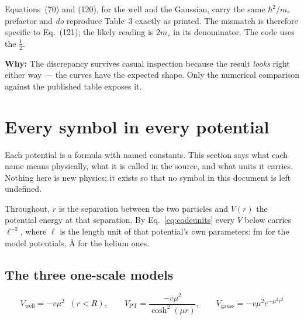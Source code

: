 \documentclass[11pt,a4paper]{article}
\newcommand{\why}[1]{\medskip\noindent\textbf{Why:} #1\medskip}
\begin{document}
Equations~(70) and (120), for the well and the Gaussian, carry the same
$\hbar^2/m_r$ prefactor and \emph{do} reproduce Table~3 exactly as printed. The
mismatch is therefore specific to Eq.~(121); the likely reading is $2m_r$ in its
denominator. The code uses the $\tfrac12$.

\why{The discrepancy survives casual inspection because the result
\emph{looks} right either way --- the curves have the expected shape. Only the
numerical comparison against the published table exposes it.}

\section{Every symbol in every potential}
\label{sec:symbols}

Each potential is a formula with named constants. This section says what each
name means physically, what it is called in the source, and what units it
carries. Nothing here is new physics; it exists so that no symbol in this
document is left undefined.

Throughout, $r$ is the separation between the two particles and $V(r)$ the
potential energy at that separation. By Eq.~\eqref{eq:codeunits} every $V$ below
carries $\ell^{-2}$, where $\ell$ is the length unit of that potential's own
parameters: fm for the model potentials, \AA{} for the helium ones.

\subsection{The three one-scale models}

\[
  V_{\text{well}} = -v\mu^2 \;\; (r<R),\qquad
  V_{\text{PT}} = \frac{-v\mu^2}{\cosh^2(\mu r)},\qquad
  V_{\text{gauss}} = -v\mu^2 e^{-\mu^2r^2}
\]
\end{document}
